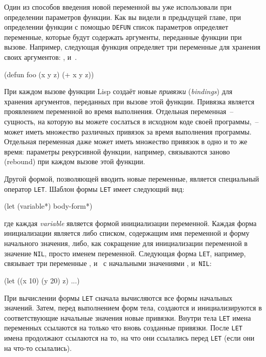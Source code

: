 Один из способов введения новой переменной вы уже использовали при определении параметров
функции. Как вы видели в предыдущей главе, при определении функции с помощью
\lstinline{DEFUN} список параметров определяет переменные, которые будут содержать аргументы,
переданные функции при вызове. Например, следующая функция определяет три переменные для
хранения своих аргументов: ,  и~.

\begin{myverb}
  (defun foo (x y z) (+ x y z))
\end{myverb}

При каждом вызове функции Lisp создаёт новые \textit{привязки} (\textit{bindings}) для
хранения аргументов, переданных при вызове этой функции. Привязка является проявлением
переменной во время выполнения. Отдельная переменная~-- сущность, на которую вы можете
сослаться в исходном коде своей программы,~-- может иметь множество различных привязок за
время выполнения программы. Отдельная переменная даже может иметь множество привязок в
одно и то же время: параметры рекурсивной функции, например, связываются заново (rebound)
при каждом вызове этой функции.

Другой формой, позволяющей вводить новые переменные, является специальный оператор
\lstinline{LET}. Шаблон формы \lstinline{LET} имеет следующий вид:

\begin{myverb}
  (let (variable*) body-form*)
\end{myverb}

\noindent{}где каждая \textit{variable} является формой инициализации переменной. Каждая форма
инициализации является либо списком, содержащим имя переменной и форму начального
значения, либо, как сокращение для инициализации переменной в значение \lstinline{NIL},
просто именем переменной. Следующая форма \lstinline{LET}, например, связывает три переменные
,  и~ с начальными значениями ,  и~\lstinline{NIL}:

\begin{myverb}
  (let ((x 10) (y 20) z)
    ...)
\end{myverb}

При вычислении формы \lstinline{LET} сначала вычисляются все формы начальных значений. Затем,
перед выполнением форм тела, создаются и инициализируются в соответствующие начальные
значения новые привязки. Внутри тела \lstinline{LET} имена переменных ссылаются на только что
вновь созданные привязки. После \lstinline{LET} имена продолжают ссылаются на то, на что они
ссылались перед \lstinline{LET} (если они на что-то ссылались).

